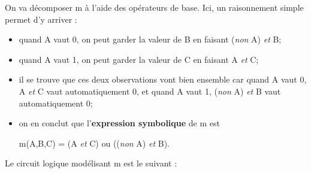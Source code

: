 On va décomposer m à l'aide des opérateurs de base. Ici, un raisonnement simple permet d'y arriver :
\begin{itemize}
    \item quand A vaut 0, on peut garder la valeur de B en faisant (\textit{non} A) \textit{et} B;
    \item quand A vaut 1, on peut garder la valeur de C en faisant A \textit{et} C;
    \item il se trouve que ces deux observations vont bien ensemble car quand A vaut 0, A \textit{et} C vaut automatiquement 0, et quand A vaut
          1, (\textit{non} A) \textit{et} B vaut automatiquement 0;
    \item on en conclut que l'\textbf{expression symbolique} de m est
          \begin{center}
              m(A,B,C) =  (A \textit{et} C) ou ((\textit{non} A)  \textit{et} B).
          \end{center}
\end{itemize}
Le circuit logique modélisant m est le suivant :
\begin{center}
\end{center}

